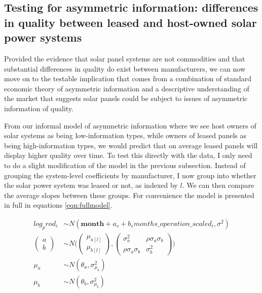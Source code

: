 \documentclass[a4paper]{article}
\begin{document}
\subsection{Testing for asymmetric information: differences in quality between leased and host-owned solar power systems}

Provided the evidence that solar panel systems are not commodities and that substantial differences in quality do exist between manufacturers, we can now move on to the testable implication that comes from a combination of standard economic theory of asymmetric information and a descriptive understanding of the market that suggests solar panels could be subject to issues of asymmetric information of quality.

From our informal model of asymmetric information where we see host owners of solar systems as being low-information types, while owners of leased panels as being high-information types, we would predict that on average leased panels will display higher quality over time. To test this directly with the data, I only need to do a slight modification of the model in the previous subsection. Instead of grouping the system-level coefficients by manufacturer, I now group into whether the solar power system was leased or not, as indexed by $l$. We can then compare the average slopes between these groups. For convenience the model is presented in full in equations \ref{eqn:fullmodel}.

\begin{equation}
\begin{aligned}
log_prod_{i} &\sim N(\mathbf{month} + a_s + b_s months\_operation\_scaled_{i}, \sigma^2)\\
\begin{pmatrix}
  a\\
  b
\end{pmatrix}
&\sim N \Bigg(
\begin{pmatrix}
  \mu_{a[l]}\\
  \mu_{b[l]}
\end{pmatrix},
\begin{pmatrix}
  \sigma_{a}^2 & \rho \sigma_{a} \sigma_{b} \\
  \rho \sigma_a \sigma_b & \sigma_b^2
\end{pmatrix} \Bigg) \\
\mu_{a} &\sim N(\theta_a, \sigma_{\mu_a}^2) \\
\mu_{b} & \sim N(\theta_b, \sigma_{\mu_b}^2) \label{eqn:fullmodel}
\end{aligned}
\end{equation}
\end{document}
